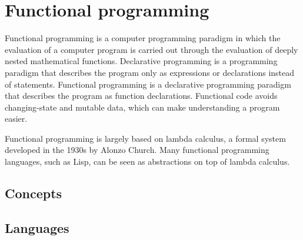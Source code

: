 \chapter{Functional programming} \label{Functional programming}


Functional programming is a computer programming paradigm in which the evaluation of a computer program is carried out
through the evaluation of deeply nested mathematical functions. Declarative programming is a programming paradigm that
describes the program only as expressions or declarations instead of statements. Functional programming is a declarative
programming paradigm that describes the program as function declarations. Functional code avoids changing-state and
mutable data, which can make understanding a program easier.

Functional programming is largely based on lambda calculus, a formal system developed in the 1930s by Alonzo Church.
Many functional programming languages, such as Lisp, can be seen as abstractions on top of lambda calculus. \cite{hudak}

\section{Concepts}

\section{Languages}

